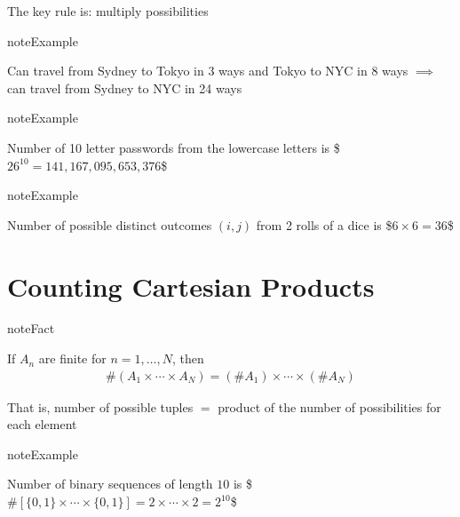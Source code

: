\documentclass[letterpaper,10pt,english]{jupyterBook}
\begin{document}
\sphinxAtStartPar
The key rule is: multiply possibilities

\begin{sphinxadmonition}{note}{Example}

\sphinxAtStartPar
Can travel from Sydney to Tokyo in 3 ways and Tokyo to NYC in 8 ways
\(\implies\) can travel from Sydney to NYC in 24 ways
\end{sphinxadmonition}

\begin{sphinxadmonition}{note}{Example}

\sphinxAtStartPar
Number of 10 letter passwords from the lowercase letters  is
\$\(
26^{10} = 141,167,095,653,376
\)\$
\end{sphinxadmonition}

\begin{sphinxadmonition}{note}{Example}

\sphinxAtStartPar
Number of possible distinct outcomes \((i, j)\) from 2 rolls of a dice is
\$\(
6 \times 6 = 36
\)\$
\end{sphinxadmonition}


\section{Counting Cartesian Products}
\label{\detokenize{03.set_theory:counting-cartesian-products}}
\begin{sphinxadmonition}{note}{Fact}

\sphinxAtStartPar
If \(A_n\) are finite for \(n=1, \ldots,N\), then
\begin{equation*}
\begin{split}
\#(A_1 \times \cdots \times A_N) = (\# A_1) \times \cdots \times (\# A_N)
\end{split}
\end{equation*}\end{sphinxadmonition}

\sphinxAtStartPar
That is, number of possible tuples \(=\) product of the number of
possibilities for each element

\begin{sphinxadmonition}{note}{Example}

\sphinxAtStartPar
Number of binary sequences of length \(10\) is
\$\(
\# [\{0, 1\} \times \cdots \times \{0, 1\}]
= 2 \times \cdots \times 2 = 2^{10}
\)\$
\end{sphinxadmonition}

\sphinxAtStartPar
{}
\end{document}
